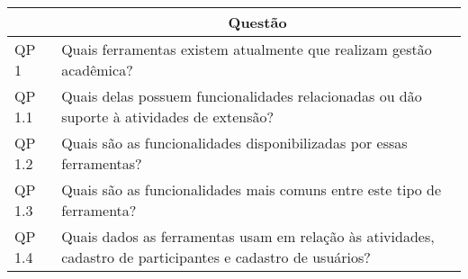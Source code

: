 \begin{table}[!htb]
  \centering
  \label{tab:research-questions}
  \footnotesize
  \begin{tabular}{l|p{9cm}}
    \bottomrule
    \rowcolor[rgb]{0.753,0.753,0.753} \multicolumn{1}{c|}{\textbf{ID}} & \multicolumn{1}{c}{\textbf{Questão}}                                                                        \\
    \hline
    \rowcolor[rgb]{0.898,0.898,0.898} QP 1                             & Quais ferramentas existem atualmente que realizam gestão acadêmica?                                         \\
    QP 1.1                                                             & Quais delas possuem funcionalidades relacionadas ou dão suporte à atividades de extensão?                   \\
    \rowcolor[rgb]{0.898,0.898,0.898} QP 1.2                           & Quais são as funcionalidades disponibilizadas por essas ferramentas?                                        \\
    QP 1.3                                                             & Quais são as funcionalidades mais comuns entre este tipo de ferramenta?                                     \\
    \rowcolor[rgb]{0.898,0.898,0.898} QP 1.4                           & Quais dados as ferramentas usam em relação às atividades, cadastro de participantes e cadastro de usuários? \\
    \toprule
  \end{tabular}
\end{table}